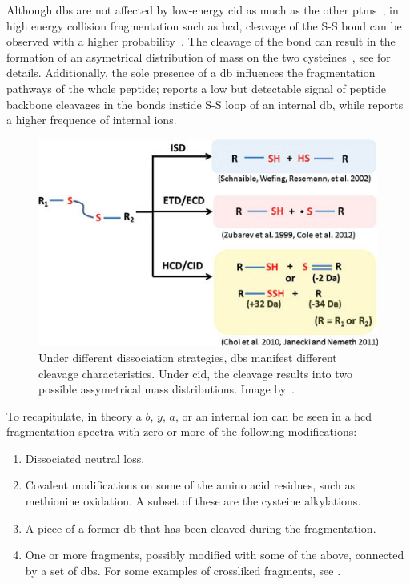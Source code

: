 Although \glspl*{db} are not affected by low-energy \gls*{cid} as much as the other \glspl*{ptm}~\cite{paizs2005fragmentation, lioe2007novel}, in high energy collision fragmentation such as \gls*{hcd}, cleavage of the S-S bond can be observed with a higher probability~\cite{bean1992characterization}. The cleavage of the bond can result in the formation of an asymetrical distribution of mass on the two cysteines~\cite{zhang2006mapping}, see  for details. Additionally, the sole presence of a \gls*{db} influences the fragmentation pathways of the whole peptide; \citet{mormann2008fragmentation} reports a low but detectable signal of peptide backbone cleavages in the bonds instide S-S loop of an internal \gls*{db}, while \citet{clark2011collision} reports a higher frequence of internal ions.

\begin{figure}
  \centering
  \includegraphics[width=.6\linewidth]{img/disulfide-bond-cleavage-assymetry.jpg}
  \caption{Under different dissociation strategies, \glspl*{db} manifest different cleavage characteristics. Under \gls*{cid}, the cleavage results into two possible assymetrical mass distributions. Image by~\citet{tsai2013mass}.}\label{fig:disulfide-bond-cleavage-assymetry}
\end{figure}

To recapitulate, in theory a \(b\), \(y\), \(a\), or an internal ion can be seen in a \gls*{hcd} fragmentation spectra with zero or more of the following modifications:

\begin{enumerate}
  \item Dissociated neutral loss.
  \item Covalent modifications on some of the amino acid residues, such as methionine oxidation. A subset of these are the cysteine alkylations.
  \item A piece of a former \gls*{db} that has been cleaved during the fragmentation.
  \item One or more fragments, possibly modified with some of the above, connected by a set of \glspl*{db}. For some examples of crossliked fragments, see .
\end{enumerate}

